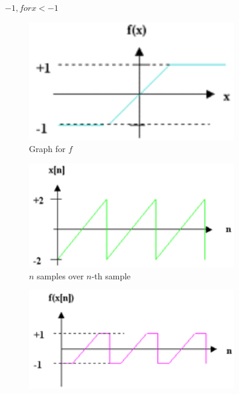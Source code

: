 \begin{example}
\begin{enumerate}
		${-1, for x<-1}$
		\bigskip %
		\begin{figure}[ht!]
			\centering
			\includegraphics[width=90mm]{pics/clip_1.png}
			\caption{Graph for $f$}
			\label{hard_clip_function}
		\end{figure}
		\bigskip %
		\begin{figure}[ht!]
			\centering
			\includegraphics[width=90mm]{pics/clip_2.png}
			\caption{$n$ samples over $n$-th sample}
			\label{samples_nth_sample}
		\end{figure}
		\bigskip %
		\begin{figure}[ht!]
			\centering
			\includegraphics[width=90mm]{pics/clip_3.png}

\end{figure}
\end{enumerate}
\end{example}

